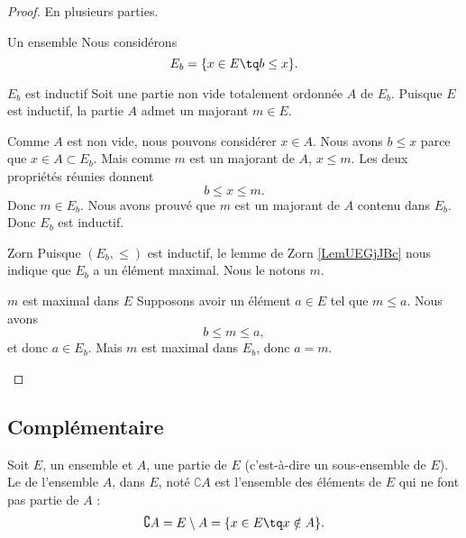 \begin{proof}
    En plusieurs parties.
    \begin{subproof}
    \item[Un ensemble]
        Nous considérons
        \begin{equation}
            E_b=\{ x\in E\tq b\leq x \}.
        \end{equation}
    \item[\( E_b\) est inductif]
        Soit une partie non vide totalement ordonnée \( A\) de \( E_b\). Puisque \( E\) est inductif, la partie \( A\) admet un majorant \( m\in E\).

        Comme \( A\) est non vide, nous pouvons considérer \( x\in A\). Nous avons $ b\leq x$ parce que \( x\in A\subset E_b\). Mais comme \( m\) est un majorant de \( A\), \( x\leq m\). Les deux propriétés réunies donnent
        \begin{equation}
            b\leq x\leq m.
        \end{equation}
        Donc \( m\in E_b\). Nous avons prouvé que \( m\) est un majorant de \( A\) contenu dans \( E_b\). Donc \( E_b\) est inductif.
    \item[Zorn]
        Puisque \( (E_b,\leq)\) est inductif, le lemme de Zorn \ref{LemUEGjJBc} nous indique que \( E_b\) a un élément maximal. Nous le notons \( m\).
    \item[\( m\) est maximal dans \( E\)]
        Supposons avoir un élément \( a\in E\) tel que \( m\leq a\). Nous avons
        \begin{equation}
            b\leq m\leq a,
        \end{equation}
        et donc \( a\in E_b\). Mais \( m\) est maximal dans \( E_b\), donc \( a=m\).
    \end{subproof}
\end{proof}


\subsection{Complémentaire}
\label{AppComplement}

\begin{definition}
    Soit $E$, un ensemble et $A$, une partie de $E$ (c'est-à-dire un sous-ensemble de $E$). Le  de l'ensemble $A$, dans $E$, noté $\complement A$ est l'ensemble des éléments de $E$ qui ne font pas partie de $A$ :
    \begin{equation}
	    \complement A=E\setminus A=\{ x\in E\tq x\notin A \}.
    \end{equation}
\end{definition}

